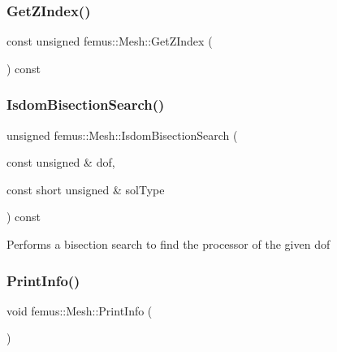 \mbox{\label{classfemus_1_1_mesh_afee5b43f46dc87fe935039b237b7ee9f}} 
\subsubsection{\texorpdfstring{Get\+Z\+Index()}{GetZIndex()}}
{\footnotesize\ttfamily const unsigned femus\+::\+Mesh\+::\+Get\+Z\+Index (\begin{DoxyParamCaption}{ }\end{DoxyParamCaption}) const\hspace{0.3cm}{\ttfamily [inline]}}

\mbox{\label{classfemus_1_1_mesh_afe41a9d6d4c7eacad589a75ed49574e3}} 
\subsubsection{\texorpdfstring{Isdom\+Bisection\+Search()}{IsdomBisectionSearch()}}
{\footnotesize\ttfamily unsigned femus\+::\+Mesh\+::\+Isdom\+Bisection\+Search (\begin{DoxyParamCaption}\item[{const unsigned \&}]{dof,  }\item[{const short unsigned \&}]{sol\+Type }\end{DoxyParamCaption}) const}

Performs a bisection search to find the processor of the given dof \mbox{\label{classfemus_1_1_mesh_aed86b865485ae162537e960cb5067534}} 
\subsubsection{\texorpdfstring{Print\+Info()}{PrintInfo()}}
{\footnotesize\ttfamily void femus\+::\+Mesh\+::\+Print\+Info (\begin{DoxyParamCaption}{ }\end{DoxyParamCaption})}



